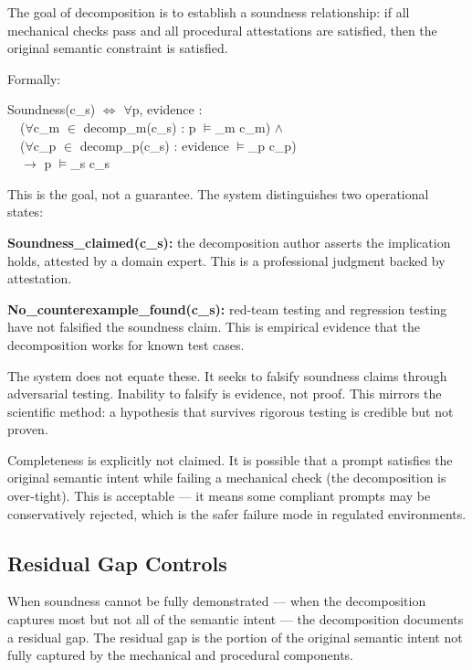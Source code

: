 The goal of decomposition is to establish a soundness relationship: if all mechanical checks pass and all procedural attestations are satisfied, then the original semantic constraint is satisfied.

Formally:

\begin{claddisp}
Soundness(c\_s) $\Leftrightarrow$ $\forall$p, evidence :\\
~~($\forall$c\_m $\in$ decomp\_m(c\_s) : p $\vDash$\_m c\_m) $\wedge$\\
~~($\forall$c\_p $\in$ decomp\_p(c\_s) : evidence $\vDash$\_p c\_p)\\
~~$\to$ p $\vDash$\_s c\_s
\end{claddisp}


This is the goal, not a guarantee. The system distinguishes two operational states:

\textbf{Soundness\_\allowbreak{}claimed(c\_\allowbreak{}s):} the decomposition author asserts the implication holds, attested by a domain expert. This is a professional judgment backed by attestation.

\textbf{No\_\allowbreak{}counterexample\_\allowbreak{}found(c\_\allowbreak{}s):} red-team testing and regression testing have not falsified the soundness claim. This is empirical evidence that the decomposition works for known test cases.

The system does not equate these. It seeks to falsify soundness claims through adversarial testing. Inability to falsify is evidence, not proof. This mirrors the scientific method: a hypothesis that survives rigorous testing is credible but not proven.

Completeness is explicitly not claimed. It is possible that a prompt satisfies the original semantic intent while failing a mechanical check (the decomposition is over-tight). This is acceptable --- it means some compliant prompts may be conservatively rejected, which is the safer failure mode in regulated environments.

\subsection{Residual Gap Controls}


When soundness cannot be fully demonstrated --- when the decomposition captures most but not all of the semantic intent --- the decomposition documents a residual gap. The residual gap is the portion of the original semantic intent not fully captured by the mechanical and procedural components.

